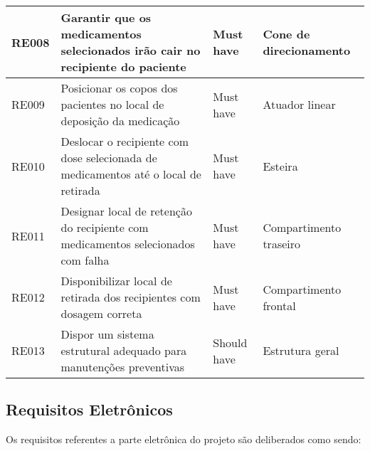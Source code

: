 \begin{table}[H]
\begin{adjustbox}{max width = \textwidth}
\begin{tabular}{|L{1.5cm}|L{8.5cm}|C{2.5cm}|C{3.5cm}|}
            RE008 & Garantir que os medicamentos selecionados irão cair no recipiente do paciente & Must have  & Cone de direcionamento\\ 
            \hline
            
            RE009 & Posicionar os copos dos pacientes no local de deposição da medicação & Must have & Atuador linear\\
            \hline
            
            RE010 & Deslocar o recipiente com dose selecionada de medicamentos até o local de retirada & Must have & Esteira\\ 
            \hline
            
            RE011 & Designar local de retenção do recipiente com medicamentos selecionados com falha & Must have & Compartimento traseiro\\
            \hline
            
            RE012 & Disponibilizar local de retirada dos recipientes com dosagem correta & Must have  & Compartimento frontal\\ 
            \hline
            
            RE013 & Dispor um sistema estrutural adequado para manutenções preventivas & Should have & Estrutura geral \\
            \hline
            
        \end{tabular}
	\end{adjustbox}
\end{table}


\newpage
\subsection{Requisitos Eletrônicos}

Os requisitos referentes a parte eletrônica do projeto são deliberados como sendo:

